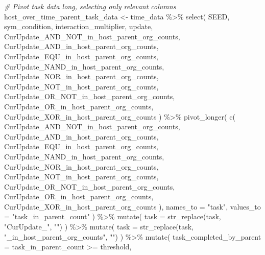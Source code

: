\documentclass[
]{book}
\newenvironment{Shaded}{\begin{snugshade}}{\end{snugshade}}
\newcommand{\AttributeTok}[1]{\textcolor[rgb]{0.77,0.63,0.00}{#1}}
\newcommand{\CommentTok}[1]{\textcolor[rgb]{0.56,0.35,0.01}{\textit{#1}}}
\newcommand{\FunctionTok}[1]{\textcolor[rgb]{0.00,0.00,0.00}{#1}}
\newcommand{\NormalTok}[1]{#1}
\newcommand{\OtherTok}[1]{\textcolor[rgb]{0.56,0.35,0.01}{#1}}
\newcommand{\SpecialCharTok}[1]{\textcolor[rgb]{0.00,0.00,0.00}{#1}}
\newcommand{\StringTok}[1]{\textcolor[rgb]{0.31,0.60,0.02}{#1}}
\begin{document}
\begin{Shaded}
\begin{Highlighting}[]
\CommentTok{\# Pivot task data long, selecting only relevant columns}
\NormalTok{host\_over\_time\_parent\_task\_data }\OtherTok{\textless{}{-}}\NormalTok{ time\_data }\SpecialCharTok{\%\textgreater{}\%}
  \FunctionTok{select}\NormalTok{(}
\NormalTok{    SEED,}
\NormalTok{    sym\_condition,}
\NormalTok{    interaction\_multiplier,}
\NormalTok{    update,}
\NormalTok{    CurUpdate\_AND\_NOT\_in\_host\_parent\_org\_counts,}
\NormalTok{    CurUpdate\_AND\_in\_host\_parent\_org\_counts,}
\NormalTok{    CurUpdate\_EQU\_in\_host\_parent\_org\_counts,}
\NormalTok{    CurUpdate\_NAND\_in\_host\_parent\_org\_counts,}
\NormalTok{    CurUpdate\_NOR\_in\_host\_parent\_org\_counts,}
\NormalTok{    CurUpdate\_NOT\_in\_host\_parent\_org\_counts,}
\NormalTok{    CurUpdate\_OR\_NOT\_in\_host\_parent\_org\_counts,}
\NormalTok{    CurUpdate\_OR\_in\_host\_parent\_org\_counts,}
\NormalTok{    CurUpdate\_XOR\_in\_host\_parent\_org\_counts}
\NormalTok{  ) }\SpecialCharTok{\%\textgreater{}\%}
  \FunctionTok{pivot\_longer}\NormalTok{(}
    \FunctionTok{c}\NormalTok{(}
\NormalTok{      CurUpdate\_AND\_NOT\_in\_host\_parent\_org\_counts,}
\NormalTok{      CurUpdate\_AND\_in\_host\_parent\_org\_counts,}
\NormalTok{      CurUpdate\_EQU\_in\_host\_parent\_org\_counts,}
\NormalTok{      CurUpdate\_NAND\_in\_host\_parent\_org\_counts,}
\NormalTok{      CurUpdate\_NOR\_in\_host\_parent\_org\_counts,}
\NormalTok{      CurUpdate\_NOT\_in\_host\_parent\_org\_counts,}
\NormalTok{      CurUpdate\_OR\_NOT\_in\_host\_parent\_org\_counts,}
\NormalTok{      CurUpdate\_OR\_in\_host\_parent\_org\_counts,}
\NormalTok{      CurUpdate\_XOR\_in\_host\_parent\_org\_counts}
\NormalTok{    ),}
    \AttributeTok{names\_to =} \StringTok{"task"}\NormalTok{,}
    \AttributeTok{values\_to =} \StringTok{"task\_in\_parent\_count"}
\NormalTok{  ) }\SpecialCharTok{\%\textgreater{}\%}
  \FunctionTok{mutate}\NormalTok{(}
    \AttributeTok{task =} \FunctionTok{str\_replace}\NormalTok{(task, }\StringTok{"CurUpdate\_"}\NormalTok{, }\StringTok{""}\NormalTok{)}
\NormalTok{  ) }\SpecialCharTok{\%\textgreater{}\%}
  \FunctionTok{mutate}\NormalTok{(}
    \AttributeTok{task =} \FunctionTok{str\_replace}\NormalTok{(task, }\StringTok{"\_in\_host\_parent\_org\_counts"}\NormalTok{, }\StringTok{""}\NormalTok{)}
\NormalTok{  ) }\SpecialCharTok{\%\textgreater{}\%}
  \FunctionTok{mutate}\NormalTok{(}
    \AttributeTok{task\_completed\_by\_parent =}\NormalTok{ task\_in\_parent\_count }\SpecialCharTok{\textgreater{}=}\NormalTok{ threshold,}

\end{Highlighting}
\end{Shaded}
\end{document}
